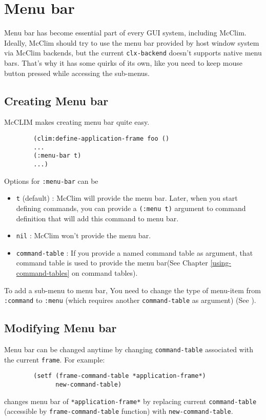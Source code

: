 \chapter{Menu bar}

Menu bar has become essential part of every GUI system, including
McClim. Ideally, McClim should try to use the menu bar provided by
host window system via McClim backends, but the current
\texttt{clx-backend} doesn't supports native menu bars. That's why it
has some quirks of its own, like you need to keep mouse button pressed
while accessing the sub-menus.

\section{Creating Menu bar}
\label{creating-menu-bar}

McCLIM makes creating menu bar quite easy.

\begin{verbatim}
        (clim:define-application-frame foo ()
        ...
        (:menu-bar t)
        ...)
\end{verbatim}

Options for \texttt{:menu-bar} can be
\begin{itemize}
\item
  \texttt{t} (default) : McClim will provide the menu bar. Later, when
  you start defining commands, you can provide a \texttt{(:menu t)}
  argument to command definition that will add this command to menu
  bar.
\item
  \texttt{nil} : McClim won’t provide the menu bar.
\item
  \texttt{command-table} : If you provide a named command table as
  argument, that command table is used to provide the menu bar(See
  Chapter \ref{using-command-tables} on command tables).
\end{itemize}

To add a sub-menu to menu bar, You need to change the type of
menu-item from \texttt{:command} to \texttt{:menu} (which requires
another \texttt{command-table} as argument) (See
).

\section{Modifying Menu bar}

Menu bar can be changed anytime by changing \texttt{command-table}
associated with the current \texttt{frame}. For example:
\begin{verbatim}
        (setf (frame-command-table *application-frame*)
              new-command-table)
\end{verbatim}
changes menu bar of \texttt{*application-frame*} by replacing current
\texttt{command-table} (accessible by \texttt{frame-command-table}
function) with \texttt{new-command-table}.

